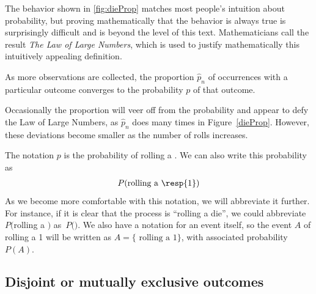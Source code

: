 The behavior shown in \ref{fig:dieProp} matches most people's intuition about probability, but proving mathematically that the behavior is always true is surprisingly difficult and is beyond the level of this text.  Mathematicians call the result \textit{The Law of Large Numbers}, which is used to justify mathematically this intuitively appealing definition.


\begin{termBox}{
As more observations are collected, the proportion $\hat{p}_n$ of occurrences with a particular outcome converges to the probability $p$ of that outcome.}
\end{termBox}

Occasionally the proportion will veer off from the probability and appear to defy the Law of Large Numbers, as $\hat{p}_n$ does many times in Figure~\ref{dieProp}. However, these deviations become smaller as the number of rolls increases.

The notation $p$ is the probability of rolling a . We can also write this probability as
\begin{eqnarray*}
P(\text{rolling a \resp{1}})
\end{eqnarray*}
As we become more comfortable with this notation, we will abbreviate it further. For instance, if it is clear that the process is ``rolling a die'', we could abbreviate $P($rolling a $)$ as~$P($$)$.  We also have a notation for an event itself, so the event $A$ of rolling a 1 will be written as $A = \{\text{ rolling a 1}\}$, with associated probability $P(A)$. 



\subsection{Disjoint or mutually exclusive outcomes}

